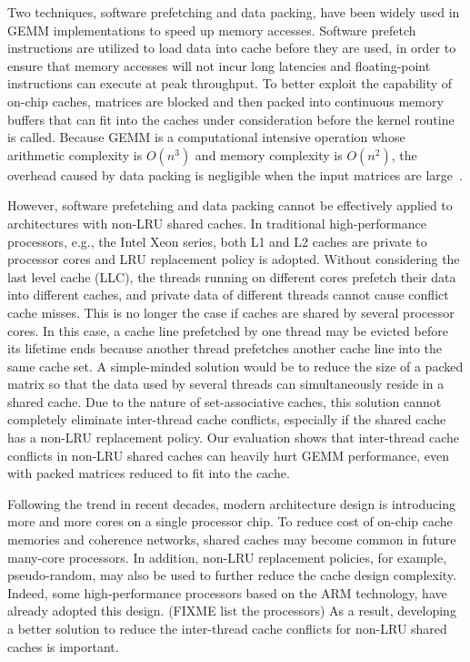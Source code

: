 Two techniques, software prefetching and data packing,
have been widely used in GEMM implementations to speed up memory accesses.
Software prefetch instructions are utilized
to load data into cache before they are used, in 
order to ensure that memory accesses will not incur
long latencies and floating-point instructions
can execute at peak throughput.
To better exploit the capability of on-chip caches,
matrices are blocked and then packed into continuous memory buffers
that can fit into the caches under consideration
before the kernel routine is called.
Because GEMM is a computational intensive operation whose
arithmetic complexity is $O(n^3)$ and memory complexity is $O(n^2)$,
the overhead caused by data packing is negligible when
the input matrices are large~\cite{gotogemm}.


However, software prefetching and data packing cannot be effectively
applied to architectures with non-LRU shared caches.
In traditional high-performance processors, e.g., the Intel Xeon series,
both L1 and L2 caches are private to processor cores
and LRU replacement policy is adopted.
Without considering the last level cache (LLC),
the threads running on different cores prefetch their data into
different caches, and private data of different threads
cannot cause conflict cache misses.
This is no longer the case if caches are shared by several processor cores.
In this case, a cache line prefetched by one thread
may be evicted before its lifetime ends because another thread prefetches
another cache line into the same cache set.
A simple-minded solution would be to reduce 
the size of a packed matrix
so that the data used by several threads can simultaneously reside in a shared cache.
Due to the nature of set-associative caches,
this solution cannot completely eliminate inter-thread cache conflicts,
especially if the shared cache has a non-LRU replacement policy.
Our evaluation shows that inter-thread cache conflicts
in non-LRU shared caches
can heavily hurt GEMM performance,
even with packed matrices reduced to fit into the cache.

Following the trend in recent decades, modern architecture design
is introducing more and more cores on a single processor chip.
To reduce cost of on-chip cache memories and coherence networks,
shared caches may become common in future many-core processors.
In addition, non-LRU replacement policies, for example, pseudo-random,
may also be used to further reduce the cache design complexity.
Indeed, some high-performance processors based on the
ARM technology,
have already adopted this design. (FIXME list the processors)
As a result, developing a better solution to reduce
the inter-thread cache conflicts 
for non-LRU shared caches is important.

